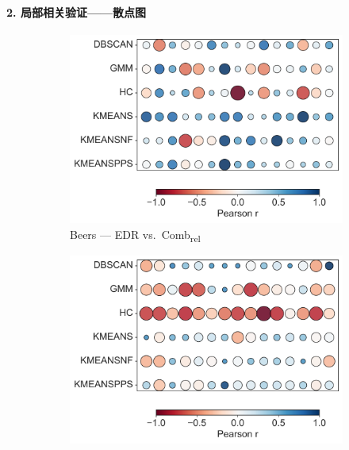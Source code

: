 \documentclass[10pt]{article} %
\numberwithin{equation}{section}
\begin{document}
\paragraph{2. 局部相关验证——散点图}\par
\begin{figure}[htbp]  %
  \centering
  \begin{subfigure}[b]{0.33\linewidth}
    \includegraphics[width=\linewidth]{figures/6.4.3graph/BE_EDR_vs_Comb_relative.pdf}
    \caption{Beers — EDR vs.\ Comb\textsubscript{rel}}
    \label{fig:be_edr_comb}
  \end{subfigure}\hfill
  \begin{subfigure}[b]{0.33\linewidth}
    \includegraphics[width=\linewidth]{figures/6.4.3graph/BE_F1_vs_Sil_relative.pdf}

\end{subfigure}
\end{figure}
\end{document}
